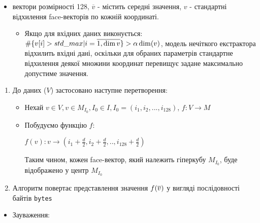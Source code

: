 \documentclass[11pt]{article}
\providecommand{\tightlist}{%
      \setlength{\itemsep}{0pt}\setlength{\parskip}{0pt}}
\def\gt{>}
\begin{document}
\begin{itemize}
  \begin{itemize}
  \tightlist
  \item
    вектори розмірності 128, \(\overline{v}\) - містить середні
    значення, \(\overset{\text{~}}{v}\) - стандартні відхилення
    face-векторів по кожній координаті.

    \begin{itemize}
    \tightlist
    \item
      Якщо для вхідних даних виконується:
      \(\#\{\overset{\text{~}}{v}[i]>std\_max\space|\space i = \overline{\small{1,\dim{\overset{\text{~}}{v}}}}\} \gt  \alpha \dim(\overset{\text{~}}{v})\),
      модель нечіткого екстрактора відхилить вхідні дані, оскільки для
      обраних параметрів стандартне відхилення деякої множини координат
      перевищує задане максимально допустиме значення.
    \end{itemize}
  \end{itemize}

  \begin{enumerate}
  \def\labelenumi{\arabic{enumi}.}
  \setcounter{enumi}{2}
  \tightlist
  \item
    До даних (\(V\)) застосовано наступне перетворення:

    \begin{itemize}
    \item
      Нехай
      \(v \in V, v \in M_{I_0}, I_0 \in I, I_0 = (i_1,i_2,...,i_{128})\),
      \(f: V \rightarrow M\)
    \item
      Побудуємо функцію \(f\):

      \(f(v): v \longrightarrow (i_1+\frac{d}{2},i_2+\frac{d}{2},..,i_{128}+\frac{d}{2})\)

      Таким чином, кожен face-вектор, який належить гіперкубу
      \(M_{I_0}\), буде відображено у центр \(M_{I_0}\)
    \end{itemize}
  \item
    Алгоритм повертає представлення значення
    \(f(\space\overline{v}\space)\) у вигляді послідовності байтів
    \texttt{bytes}
  \end{enumerate}

  \begin{itemize}
  \tightlist
  \item
    Зауваження:


\end{itemize}
\end{itemize}
\end{document}
